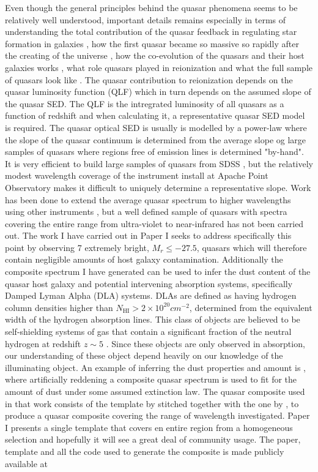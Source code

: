 Even though the general principles behind the quasar phenomena seems to be relatively well understood, important details remains especially in terms of understanding the total contribution of the quasar feedback in regulating star formation in galaxies \citep{DiMatteo2005}, how the first quasar became so massive so rapidly after the creating of the universe \cite{Wu2015a}, how the co-evolution of the quasars and their host galaxies works \citep{Ferrarese2000}, what role quasars played in reionization \citep{Hopkins2007} and what the full sample of quasars look like \citep{Krawczyk2015}. The quasar contribution to reionization depends on the quasar luminosity function (QLF) which in turn depends on the assumed slope of the quasar SED. The QLF is the intregrated luminosity of all quasars as a function of redshift and when calculating it, a representative quasar SED model is required. The quasar optical SED is usually is modelled by a power-law where the slope of the quasar continuum is determined from the average slope og large samples of quasars \citep{Vandenberk2001, Richards2006a, Shen2011, Lusso2015} where regions free of emission lines is determined "by-hand". It is very efficient to build large samples of quasars from SDSS \citep{Paris2014}, but the relatively modest wavelength coverage of the instrument install at Apache Point Observatory \citep{Gunn2006} makes it difficult to uniquely determine a representative slope. Work has been done to extend the average quasar spectrum to higher wavelengths using other instruments \citep{Glikman2006}, but a well defined sample of quasars with spectra covering the entire range from ultra-violet to near-infrared has not been carried out. The work I have carried out in Paper I seeks to address specifically this point by observing 7 extremely bright, $M_{r} \leq -27.5$, quasars which will therefore contain negligible amounts of host galaxy contamination. Additionally the composite spectrum I have generated can be used to infer the dust content of the quasar host galaxy and potential intervening absorption systems, specifically Damped Lyman Alpha (DLA) systems. DLAs are defined as having hydrogen column densities higher than $N_{\mathrm{HI}} > 2 \times 10^{20} cm^{-2}$, determined from the equivalent width of the hydrogen absorption lines. This class of objects are believed to be self-shielding systems of gas that contain a significant fraction of the neutral hydrogen at redshift $z \sim 5$ \citep{StorrieLombardi2000}. Since these objects are only observed in absorption, our understanding of these object depend heavily on our knowledge of the illuminating object. An example of inferring the dust properties and amount is \citet{Krogager2015}, where artificially reddening a composite quasar spectrum is used to fit for the amount of dust under some assumed extinction law. The quasar composite used in that work consists of the template by \citet{Vandenberk2001} stitched together with the one by \citet{Glikman2006}, to produce a quasar composite covering the range of wavelength investigated. Paper I presents a single template that covers en entire region from a homogeneous selection and hopefully it will see a great deal of community usage. The paper, template and all the code used to generate the composite is made publicly available at 